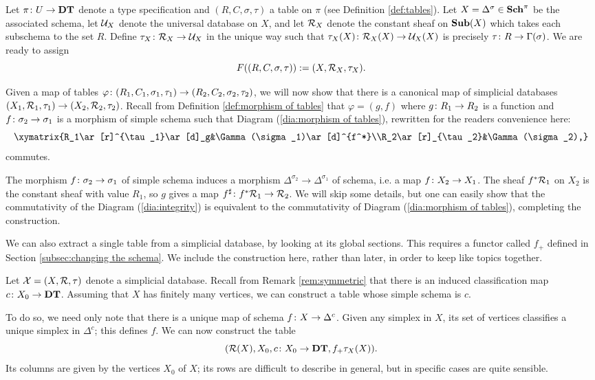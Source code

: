 \documentclass{amsart}
\begin{document}
\begin{construction}\label{con:table as database}

Let $\pi\colon U\rightarrow{\bf DT}$ denote a type specification and $(R,C,\sigma,\tau)$ a table on $\pi$ (see Definition \ref{def:tables}).  Let $X=\Delta^\sigma\in{\bf Sch}^\pi$ be the associated schema, let $\mathcal{U}_X$ denote the universal database on $X$, and let $\mathcal{R}_X$ denote the constant sheaf on ${\bf Sub}(X)$ which takes each subschema to the set $R$.  Define $\tau_X\colon\mathcal{R}_X\rightarrow\mathcal{U}_X$ in the unique way such that $\tau_X(X)\colon\mathcal{R}_X(X)\rightarrow\mathcal{U}_X(X)$ is precisely $\tau\colon R\rightarrow\Gamma(\sigma)$.  We are ready to assign $$F((R,C,\sigma,\tau)):=(X,\mathcal{R}_X,\tau_X).$$

Given a map of tables $\varphi\colon(R_1,C_1,\sigma_1,\tau_1)\rightarrow(R_2,C_2,\sigma_2,\tau_2)$, we will now show that there is a canonical map of simplicial databases $(X_1,\mathcal{R}_1,\tau_1)\rightarrow(X_2,\mathcal{R}_2,\tau_2)$.  Recall from Definition \ref{def:morphism of tables} that $\varphi=(g,f)$ where $g\colon R_1\rightarrow R_2$ is a function and $f\colon\sigma_2\rightarrow\sigma_1$ is a morphism of simple schema such that Diagram (\ref{dia:morphism of tables}), rewritten for the readers convenience here: $$\xymatrix{R_1\ar[r]^{\tau_1}\ar[d]_g&\Gamma(\sigma_1)\ar[d]^{f^*}\\R_2\ar[r]_{\tau_2}&\Gamma(\sigma_2),}$$ commutes.

The morphism $f\colon\sigma_2\rightarrow\sigma_1$ of simple schema induces a morphism $\Delta^{\sigma_2}\to\Delta^{\sigma_1}$ of schema, i.e. a map $f\colon X_2\rightarrow X_1$.  The sheaf $f^*\mathcal{R}_1$ on $X_2$ is the constant sheaf with value $R_1$, so $g$ gives a map $f^\sharp\colon f^*\mathcal{R}_1\rightarrow\mathcal{R}_2$.  We will skip some details, but one can easily show that the commutativity of the Diagram (\ref{dia:integrity}) is equivalent to the commutativity of Diagram (\ref{dia:morphism of tables}), completing the construction.

\end{construction}

We can also extract a single table from a simplicial database, by looking at its global sections.  This requires a functor called $f_+$ defined in Section \ref{subsec:changing the schema}.  We include the construction here, rather than later, in order to keep like topics together.

\begin{construction}\label{con:database as table}

Let $\mathcal{X}=(X,\mathcal{R},\tau)$ denote a simplicial database.  Recall from Remark \ref{rem:symmetric} that there is an induced classification map $c\colon X_0\rightarrow{\bf DT}$.  Assuming that $X$ has finitely many vertices, we can construct a table whose simple schema is $c$.  

To do so, we need only note that there is a unique map of schema $f\colon X\rightarrow\Delta^c$.  Given any simplex in $X$, its set of vertices classifies a unique simplex in $\Delta^c$; this defines $f$.  We can now construct the table $$(\mathcal{R}(X),X_0,c\colon X_0\rightarrow{\bf DT},f_+\tau_X(X)).$$  Its columns are given by the vertices $X_0$ of $X$; its rows are difficult to describe in general, but in specific cases are quite sensible.

\end{construction}
\end{document}

